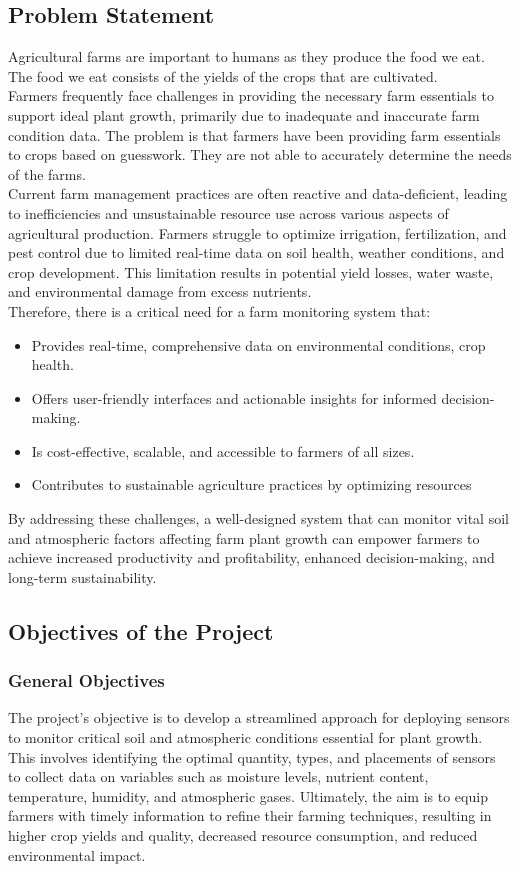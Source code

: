 \documentclass[12pt, a4paper]{article}
\begin{document}
\newpage
\subsection{Problem Statement}
Agricultural farms are important to humans as they produce the food we eat. The food we eat consists of the yields of the crops that are cultivated.\\ 
Farmers frequently face challenges in providing the necessary farm essentials to support ideal plant growth, primarily due to inadequate and inaccurate farm condition data. The problem is that farmers have been providing farm essentials to crops based on guesswork. They are not able to accurately determine the needs of the farms.
\\
Current farm management practices are often reactive and data-deficient, leading to inefficiencies and unsustainable resource use across various aspects of agricultural production. Farmers struggle to optimize irrigation, fertilization, and pest control due to limited real-time data on soil health, weather conditions, and crop development. This limitation results in potential yield losses, water waste, and environmental damage from excess nutrients.
\\
Therefore, there is a critical need for a farm monitoring system that:
\begin{itemize}
 \item Provides real-time, comprehensive data on environmental conditions, crop health.
 \item Offers user-friendly interfaces and actionable insights for informed decision-making.
 \item Is cost-effective, scalable, and accessible to farmers of all sizes.
 \item Contributes to sustainable agriculture practices by optimizing resources
\end{itemize}
By addressing these challenges, a well-designed system that can monitor vital soil and atmospheric factors affecting farm plant growth can empower farmers to achieve increased productivity and profitability, enhanced decision-making, and long-term sustainability.



\newpage
\subsection{Objectives of the Project}
\subsubsection{General Objectives}
The project's objective is to develop a streamlined approach for deploying sensors to monitor critical soil and atmospheric conditions essential for plant growth. This involves identifying the optimal quantity, types, and placements of sensors to collect data on variables such as moisture levels, nutrient content, temperature, humidity, and atmospheric gases. Ultimately, the aim is to equip farmers with timely information to refine their farming techniques, resulting in higher crop yields and quality, decreased resource consumption, and reduced environmental impact.
\end{document}
